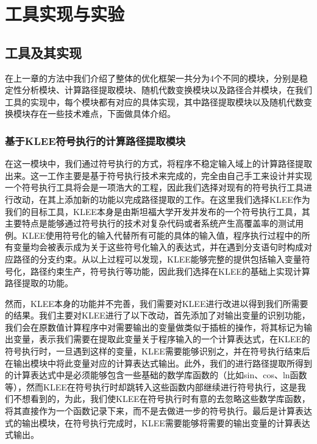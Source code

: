 \chapter{工具实现与实验}\label{chapter_experiment}

\section{工具及其实现}

在上一章的方法中我们介绍了整体的优化框架一共分为4个不同的模块，分别是稳定性分析模块、计算路径提取模块、随机代数变换模块以及路径合并模块，在我们工具的实现中，每个模块都有对应的具体实现，其中路径提取模块以及随机代数变换模块存在一些技术难点，下面做具体介绍。

\subsection{基于KLEE符号执行的计算路径提取模块}

在这一模块中，我们通过符号执行的方式，将程序不稳定输入域上的计算路径提取出来。这一工作主要是基于符号执行技术来完成的，完全由自己手工来设计并实现一个符号执行工具将会是一项浩大的工程，因此我们选择对现有的符号执行工具进行改动，在其上添加新的功能以完成路径提取的工作。在这里我们选择KLEE作为我们的目标工具，KLEE本身是由斯坦福大学开发并发布的一个符号执行工具，其主要特点是能够通过符号执行的技术对复杂代码或者系统产生高覆盖率的测试用例。KLEE使用符号化的输入代替所有可能的具体的输入值，程序执行过程中的所有变量均会被表示成为关于这些符号化输入的表达式，并在遇到分支语句时构成对应路径的分支约束。从以上过程可以发现，KLEE能够完整的提供包括输入变量符号化，路径约束生产，符号执行等功能，因此我们选择在KLEE的基础上实现计算路径提取的功能。

然而，KLEE本身的功能并不完善，我们需要对KLEE进行改进以得到我们所需要的结果。我们主要对KLEE进行了以下改动，首先添加了对输出变量的识别功能，我们会在原数值计算程序中对需要输出的变量做类似于插桩的操作，将其标记为输出变量，表示我们需要在提取此变量关于程序输入的一个计算表达式，在KLEE的符号执行时，一旦遇到这样的变量，KLEE需要能够识别之，并在符号执行结束后在输出模块中将此变量对应的计算表达式输出。此外，我们的进行路径提取所得到的计算表达式中是必须能够包含一些基础的数学库函数的（比如sin、cos、ln函数等），然而KLEE在符号执行时却跳转入这些函数内部继续进行符号执行，这是我们不想看到的，为此，我们使KLEE在符号执行时有意的去忽略这些数学库函数，将其直接作为一个函数记录下来，而不是去做进一步的符号执行。最后是计算表达式的输出模块，在符号执行完成时，KLEE需要能够将需要的输出变量的计算表达式输出。

